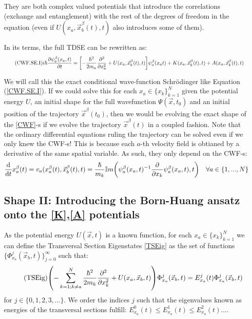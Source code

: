 \documentclass[11pt, a4paper]{article} %
\begin{document}
They are both complex valued potentials that introduce the correlations (exchange and entanglement) with the rest of the degrees of freedom in the equation (even if $U(x_a, \vec{x}_b^\beta(t), t)$ also introduces some of them).


In its terms, the full TDSE can be rewritten as:
\begin{equation*}\label{CWF.SE.I}\tag{CWF.SE.I}
i\hbar \pdv{\psi_a^\beta(x_a, t)}{t} = \qty[- \frac{\hbar^2}{2m_a}\pdv[2]{}{x_a} + U(x_a, \vec{x}_b^\beta(t), t)]\psi_a^\beta(x_a t) + K(x_a, \vec{x}_b^\beta(t), t) +A(x_a, \vec{x}_b^\beta(t), t) \quad
\end{equation*}

We will call this the exact conditional wave-function Schrödinger like Equation (\ref{CWF.SE.I}). If we could solve this for each $x_a\in\{x_k\}_{k=1}^N$ given the potential energy $U$, an initial shape for the full wavefunction $\Psi(\vec{x}, t_0)$ and an initial position of the trajectory $\vec{x}^\beta(t_0)$, then we would be evolving the exact shape of the \ref{CWF}-s if we evolve the trajectory $\vec{x}^\beta(t)$ in a coupled fashion. Note that the ordinary differential equations ruling the trajectory can be solved even if we only knew the CWF-s! This is because each $a$-th velocity field is obtianed by a derivative of the same spatial variable. As such, they only depend on the CWF-s:
$$
\dv{}{t}x^\beta_a(t)=v_a(x_a^\beta (t), \vec{x}^\beta_b(t),t)=\frac{\hbar}{m_k}\mathbb{I}m\qty(\psi_a^\beta(x_a, t)^{-1}\pdv{}{x_k}\psi_a^\beta(x_a, t),t) \quad \forall a\in \{1,...,N\}
$$
\subsection{Shape II: Introducing the Born-Huang ansatz onto the \ref{K},\ref{A} potentials}

As the potential energy $U(\vec{x},t)$ is a known function, for each $x_a\in\{x_k\}_{k=1}^N$  we can define the Transversal Section Eigenstates \ref{TSEig} as the set of functions $\{\Phi_{x_a}^j(\vec{x}_b,t)\}_{j=0}^\infty$ such that:
\begin{equation}\label{TSEig}\tag{TSEig}
\qty(- \sum_{k=1; k\neq a}^{N} \frac{\hbar^2}{2m_k}\pdv[2]{}{x_k}+U(x_a,\vec{x}_b,t) )\Phi_{x_a}^j(\vec{x}_b,t) = E_{x_a}^j(t)\Phi_{x_a}^j(\vec{x}_b,t)
\end{equation}
for $j\in\{0,1,2,3,...\}$. We order the indices $j$ such that the eigenvalues known as energies of the transversal sections fulfill: $E_{x_a}^0(t)\leq E_{x_a}^1(t)\leq E_{x_a}^2(t)...$.
\end{document}
